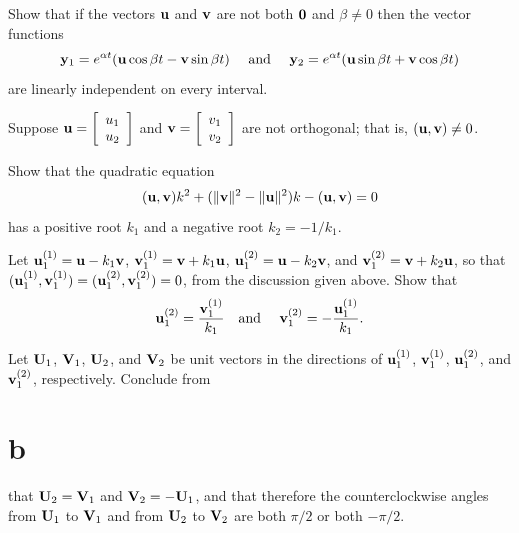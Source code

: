 \begin{exerciselist}
  \item\label{exer:10.6.27} Show that if the vectors ${\bf u}$ and ${\bf v}$ are not both ${\bf 0}$
        and $\beta\ne0$ then the vector functions
  \[
    {\bf y}_{1}=e^{\alpha t}({\bf u}\cos\beta t-{\bf v}\sin\beta t)\quad \mbox{ and }\quad{\bf y}_{2}=e^{\alpha t}({\bf u}\sin\beta t+{\bf v}\cos\beta t)
  \]
  are linearly independent on every interval. 

  \item\label{exer:10.6.28} Suppose ${\bf u}=\displaystyle{\left[\begin{array}{l}u_{1}\\u_{2}\end{array}\right]}$ and
        ${\bf v}=\displaystyle{\left[\begin{array}{l}v_{1}\\v_{2}\end{array}\right]}$ are not orthogonal; that is, $({\bf u},{\bf v})\ne0$.
  \begin{alist}
    \item %
    Show that the quadratic equation
    \[
      ({\bf u},{\bf v})k^{2}+(\|{\bf v}\|^{2}-\|{\bf u}\|^{2})k-({\bf u},{\bf v})=0
    \]
    has a positive root $k_{1}$ and a negative root $k_{2}=-1/k_{1}$.

    \item %
    Let ${\bf u}_{1}^{(1)}={\bf u}-k_{1}{\bf v}$, ${\bf v}_{1}^{(1)}={\bf v}+k_{1}{\bf u}$,
    ${\bf u}_{1}^{(2)}={\bf u}-k_{2}{\bf v}$, and ${\bf v}_{1}^{(2)}={\bf v}+k_{2}{\bf u}$, so that
    $({\bf u}_{1}^{(1)},{\bf v}_{1}^{(1)})=({\bf u}_{1}^{(2)},{\bf v}_{1}^{(2)})=0$, from the
    discussion given above. Show that
    \[
      {\bf u}_{1}^{(2)}=\frac{{\bf v}_{1}^{(1)}}{k_{1}}\mbox{\quad and \quad}{\bf v}_{1}^{(2)}=-\frac{{\bf u}_{1}^{(1)}}{k_{1}}.
    \]

    \item %
    Let ${\bf U}_{1}$, ${\bf V}_{1}$, ${\bf U}_{2}$, and ${\bf V}_{2}$ be unit vectors in the
    directions of ${\bf u}_{1}^{(1)}$, ${\bf v}_{1}^{(1)}$, ${\bf u}_{1}^{(2)}$, and
    ${\bf v}_{1}^{(2)}$, respectively. Conclude from \part{b} that ${\bf U}_{2}={\bf V}_{1}$ and
    ${\bf V}_{2}=-{\bf U}_{1}$, and that therefore the counterclockwise angles from ${\bf U}_{1}$ to
    ${\bf V}_{1}$ and from ${\bf U}_{2}$ to ${\bf V}_{2}$ are both $\pi/2$ or both $-\pi/2$.
  \end{alist}


\end{exerciselist}
